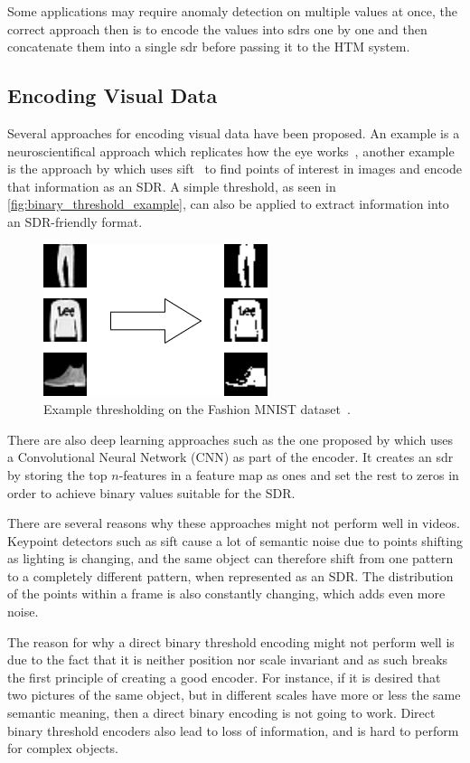 \par
Some applications may require anomaly detection on multiple values at once, the correct approach then is to encode the values into \glspl*{sdr} one by one and then concatenate them into a single \gls*{sdr} before passing it to the HTM system.
\subsection{Encoding Visual Data}
Several approaches for encoding visual data have been proposed. An example is a neuroscientifical approach which replicates how the eye works~\cite{eyeencoder}, another example is the approach by \textcite{ObjectDetectionSIFT} which uses \gls*{sift}~\cite{sift} to find points of interest in images and encode that information as an SDR. A simple threshold, as seen in \autoref{fig:binary_threshold_example}, can also be applied to extract information into an SDR-friendly format.
\begin{figure}[htb]
    \centering
    \includegraphics[width=0.3\linewidth]{resources/related_works/binary_threshold_example.png}
    \caption[Thresholding Example]{Example thresholding on the Fashion MNIST dataset~\cite{mnist_fashion}.}
    \label{fig:binary_threshold_example}
\end{figure}
\par
There are also deep learning approaches such as the one proposed by \textcite{CNN_HTM} which uses a Convolutional Neural Network (CNN) as part of the encoder. It creates an \gls*{sdr} by storing the top $n$-features in a feature map as ones and set the rest to zeros in order to achieve binary values suitable for the SDR.
\par
There are several reasons why these approaches might not perform well in videos. Keypoint detectors such as \gls*{sift} cause a lot of semantic noise due to points shifting as lighting is changing, and the same object can therefore shift from one pattern to a completely different pattern, when represented as an SDR. The distribution of the points within a frame is also constantly changing, which adds even more noise.
\par
The reason for why a direct binary threshold encoding might not perform well is due to the fact that it is neither position nor scale invariant and as such breaks the first principle of creating a good encoder. For instance, if it is desired that two pictures of the same object, but in different scales have more or less the same semantic meaning, then a direct binary encoding is not going to work. Direct binary threshold encoders also lead to loss of information, and is hard to perform for complex objects.
